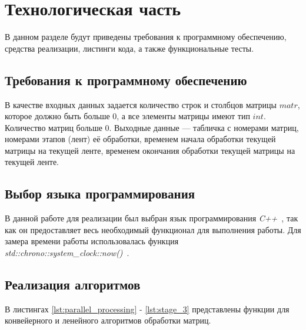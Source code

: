 \chapter{Технологическая часть}

В данном разделе будут приведены требования к программному обеспечению, средства реализации, листинги кода, а также функциональные тесты.

\section{Требования к программному обеспечению}

В качестве входных данных задается количество строк и столбцов матрицы $matr$, которое должно быть больше 0, а все элементы матрицы имеют тип $int$. Количество матриц больше 0.
Выходные данные --- табличка с номерами матриц, номерами этапов (лент) её обработки, временем начала обработки текущей матрицы на текущей ленте, временем окончания обработки текущей матрицы на текущей ленте.

\section{Выбор языка программирования}

В данной работе для реализации был выбран язык программирования \textit{C++}~\cite{bib2}, так как он предоставляет весь необходимый функционал для выполнения работы. Для замера времени работы использовалась функция \textit{std::chrono::system\_clock::now()}~\cite{bib3}.

\clearpage

\section{Реализация алгоритмов}

В листингах \ref{lst:parallel_processing} - \ref{lst:stage_3} представлены функции для конвейерного и ленейного алгоритмов обработки матриц.

